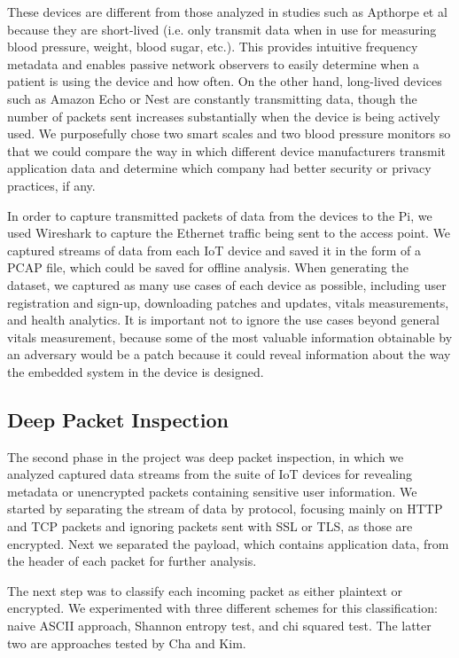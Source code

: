 These devices are different from those analyzed in studies such as Apthorpe et al \cite{apthorpeIoT} because they are short-lived (i.e. only transmit data when in use for measuring blood pressure, weight, blood sugar, etc.). This provides intuitive frequency metadata and enables passive network observers to easily determine when a patient is using the device and how often. On the other hand, long-lived devices such as Amazon Echo or Nest are constantly transmitting data, though the number of packets sent increases substantially when the device is being actively used. We purposefully chose two smart scales and two blood pressure monitors so that we could compare the way in which different device manufacturers transmit application data and determine which company had better security or privacy practices, if any. 

In order to capture transmitted packets of data from the devices to the Pi, we used Wireshark to capture the Ethernet traffic being sent to the access point. We captured streams of data from each IoT device and saved it in the form of a PCAP file, which could be saved for offline analysis. When generating the dataset, we captured as many use cases of each device as possible, including user registration and sign-up, downloading patches and updates, vitals measurements, and health analytics. It is important not to ignore the use cases beyond general vitals measurement, because some of the most valuable information obtainable by an adversary would be a patch because it could reveal information about the way the embedded system in the device is designed. 

\subsection{Deep Packet Inspection}

The second phase in the project was deep packet inspection, in which we analyzed captured data streams from the suite of IoT devices for revealing metadata or unencrypted packets containing sensitive user information. We started by separating the stream of data by protocol, focusing mainly on HTTP and TCP packets and ignoring packets sent with SSL or TLS, as those are encrypted. Next we separated the payload, which contains application data, from the header of each packet for further analysis. 

The next step was to classify each incoming packet as either plaintext or encrypted. We experimented with three different schemes for this classification: naive ASCII approach, Shannon entropy test, and chi squared test. The latter two are approaches tested by Cha and Kim.~\cite{chaMachineLearning}


